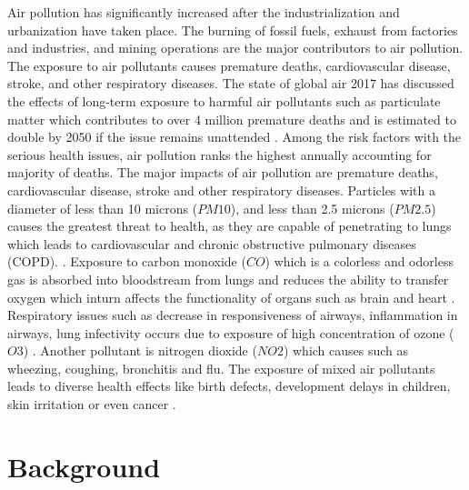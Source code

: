 Air pollution has significantly increased after the industrialization and urbanization have taken place. The burning of fossil fuels, exhaust from factories and industries, and mining operations are the major contributors to air pollution. The exposure to air pollutants causes premature deaths, cardiovascular disease, stroke, and other respiratory diseases. The state of global air 2017 has discussed the effects of long-term exposure to harmful air pollutants such as particulate matter which contributes to over 4 million premature deaths and is estimated to
double by 2050 if the issue remains unattended \cite{HealthEffectsInstitute2017}. Among the risk factors with the serious health issues, air pollution ranks the highest annually accounting for majority of deaths. The major impacts of air pollution are premature deaths, cardiovascular disease, stroke and other respiratory diseases.
Particles with a diameter of less than 10 microns ($PM10$), and less than 2.5 microns ($PM2.5$) causes the greatest threat to health, as they are capable of penetrating to lungs which leads to cardiovascular and chronic obstructive pulmonary diseases (COPD). \cite{who} \cite{Tian2016}. Exposure to carbon monoxide ($CO$) which is a colorless and odorless gas is absorbed into bloodstream from lungs and reduces the ability to transfer oxygen which inturn affects the functionality of organs such as brain and heart \cite{Sierra-vargas2012} \cite{Golbabaei2012}. Respiratory issues such as decrease in responsiveness of airways, inflammation in airways, lung infectivity occurs due to exposure of high concentration of ozone ($O3$) \cite{Lippmann1989}. Another pollutant is nitrogen dioxide ($NO2$) which causes such as wheezing, coughing, bronchitis and flu. The exposure of mixed air pollutants leads to diverse health effects like birth defects, development delays in children, skin irritation or even cancer \cite{MarilenaKampa2007}.

\section{Background}

